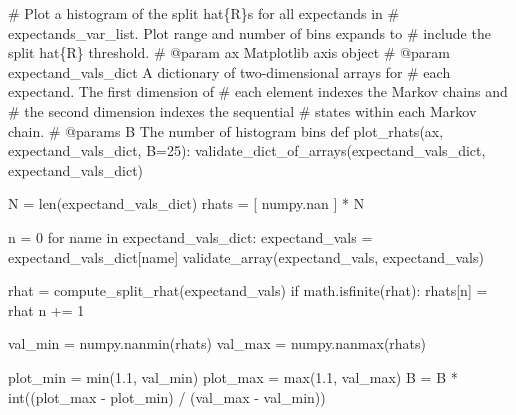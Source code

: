 \documentclass[
  letterpaper,
  DIV=11,
  numbers=noendperiod]{scrartcl}
\newenvironment{Shaded}{\begin{snugshade}}{\end{snugshade}}
\newcommand{\BuiltInTok}[1]{\textcolor[rgb]{0.00,0.23,0.31}{#1}}
\newcommand{\CommentTok}[1]{\textcolor[rgb]{0.37,0.37,0.37}{#1}}
\newcommand{\ControlFlowTok}[1]{\textcolor[rgb]{0.00,0.23,0.31}{#1}}
\newcommand{\DecValTok}[1]{\textcolor[rgb]{0.68,0.00,0.00}{#1}}
\newcommand{\FloatTok}[1]{\textcolor[rgb]{0.68,0.00,0.00}{#1}}
\newcommand{\KeywordTok}[1]{\textcolor[rgb]{0.00,0.23,0.31}{#1}}
\newcommand{\NormalTok}[1]{\textcolor[rgb]{0.00,0.23,0.31}{#1}}
\newcommand{\OperatorTok}[1]{\textcolor[rgb]{0.37,0.37,0.37}{#1}}
\newcommand{\StringTok}[1]{\textcolor[rgb]{0.13,0.47,0.30}{#1}}
\begin{document}
\begin{Shaded}
\begin{Highlighting}[]
\CommentTok{\# Plot a histogram of the split hat\{R\}s for all expectands in}
\CommentTok{\# expectands\_var\_list.  Plot range and number of bins expands to}
\CommentTok{\# include the split hat\{R\} threshold.}
\CommentTok{\# @param ax Matplotlib axis object}
\CommentTok{\# @param expectand\_vals\_dict A dictionary of two{-}dimensional arrays for}
\CommentTok{\#                            each expectand.  The first dimension of}
\CommentTok{\#                            each element indexes the Markov chains and}
\CommentTok{\#                            the second dimension indexes the sequential}
\CommentTok{\#                            states within each Markov chain.}
\CommentTok{\# @params B The number of histogram bins}
\KeywordTok{def}\NormalTok{ plot\_rhats(ax, expectand\_vals\_dict, B}\OperatorTok{=}\DecValTok{25}\NormalTok{):}
\NormalTok{  validate\_dict\_of\_arrays(expectand\_vals\_dict,}
                          \StringTok{\textquotesingle{}expectand\_vals\_dict\textquotesingle{}}\NormalTok{)}

\NormalTok{  N }\OperatorTok{=} \BuiltInTok{len}\NormalTok{(expectand\_vals\_dict)}
\NormalTok{  rhats }\OperatorTok{=}\NormalTok{ [ numpy.nan ] }\OperatorTok{*}\NormalTok{ N}

\NormalTok{  n }\OperatorTok{=} \DecValTok{0}
  \ControlFlowTok{for}\NormalTok{ name }\KeywordTok{in}\NormalTok{ expectand\_vals\_dict:}
\NormalTok{    expectand\_vals }\OperatorTok{=}\NormalTok{ expectand\_vals\_dict[name]}
\NormalTok{    validate\_array(expectand\_vals, }\StringTok{\textquotesingle{}expectand\_vals\textquotesingle{}}\NormalTok{)}

\NormalTok{    rhat }\OperatorTok{=}\NormalTok{ compute\_split\_rhat(expectand\_vals)}
    \ControlFlowTok{if}\NormalTok{ math.isfinite(rhat):}
\NormalTok{      rhats[n] }\OperatorTok{=}\NormalTok{ rhat}
\NormalTok{    n }\OperatorTok{+=} \DecValTok{1}

\NormalTok{  val\_min }\OperatorTok{=}\NormalTok{ numpy.nanmin(rhats)}
\NormalTok{  val\_max }\OperatorTok{=}\NormalTok{ numpy.nanmax(rhats)}

\NormalTok{  plot\_min }\OperatorTok{=} \BuiltInTok{min}\NormalTok{(}\FloatTok{1.1}\NormalTok{, val\_min)}
\NormalTok{  plot\_max }\OperatorTok{=} \BuiltInTok{max}\NormalTok{(}\FloatTok{1.1}\NormalTok{, val\_max)}
\NormalTok{  B }\OperatorTok{=}\NormalTok{ B }\OperatorTok{*} \BuiltInTok{int}\NormalTok{((plot\_max }\OperatorTok{{-}}\NormalTok{ plot\_min) }\OperatorTok{/}\NormalTok{ (val\_max }\OperatorTok{{-}}\NormalTok{ val\_min))}


\end{Highlighting}
\end{Shaded}
\end{document}
